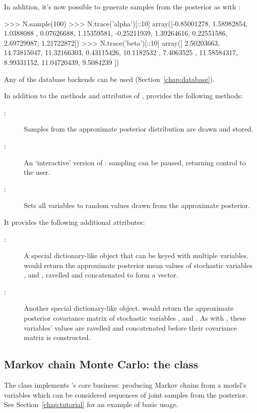 \documentclass[]{jss}
\begin{document}
In addition, it's now possible to generate samples from the posterior as with :
\begin{CodeInput}
>>> N.sample(100)
>>> N.trace('alpha')[::10]
array([-0.85001278,  1.58982854,  1.0388088 ,  0.07626688,  1.15359581,
   -0.25211939,  1.39264616,  0.22551586,  2.69729987,  1.21722872])
>>> N.trace('beta')[::10]
array([  2.50203663,  14.73815047,  11.32166303,   0.43115426,
    10.1182532 ,   7.4063525 ,  11.58584317,   8.99331152,
    11.04720439,   9.5084239 ])
\end{CodeInput}
Any of the database backends can be used (Section~\ref{chap:database}).

\bigskip
In addition to the methods and attributes of ,  provides the following methods:
\begin{description}
    \item[:] Samples from the approximate posterior distribution are drawn and stored.
    \item[:] An `interactive' version of : sampling can be paused, returning control to the user.
    \item[:] Sets all variables to random values drawn from the approximate posterior.
\end{description}
It provides the following additional attributes:
\begin{description}
    \item[:] A special dictionary-like object that can be keyed with multiple variables.  would return the approximate posterior mean values of stochastic variables ,  and , ravelled and concatenated to form a vector.
    \item[:] Another special dictionary-like object.  would return the approximate posterior covariance matrix of stochastic variables ,  and . As with , these variables' values are ravelled and concatenated before their covariance matrix is constructed.
\end{description}

\subsection[Markov chain Monte Carlo: the MCMC class]{Markov chain Monte
Carlo: the  class} \label{sec:mcmc}

The  class implements 's core business: producing Markov chains from a model's variables which can be considered sequences of joint samples from the posterior. See Section~\ref{chap:tutorial} for an example of basic usage.
\end{document}
